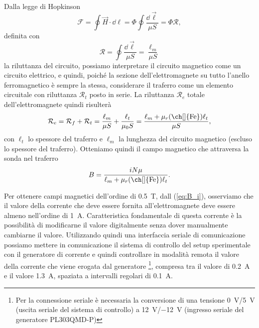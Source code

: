 \documentclass[
    prl,
    reprint, 
    superscriptaddress, 
    altaffilletter, 
    amsmath, 
    amssymb, 
    a4paper,
    varvw]{revtex4-2}
\begin{document}
Dalla legge di Hopkinson \begin{equation}
    \mathcal{F} = \oint \vec{H} \cdot \dd \ell = \Phi \oint \frac{\dd \vec{\ell}}{\mu S} = \Phi \mathcal{R},
\end{equation} definita con \[
    \mathcal{R} = \oint \frac{\dd \vec{\ell}}{\mu S} = \frac{\ell_m}{\mu S}
\] la riluttanza del circuito, possiamo interpretare il circuito magnetico come un circuito elettrico, e quindi, poiché la sezione dell'elettromagnete su tutto l'anello ferromagnetico è sempre la stessa, considerare il traferro come un elemento circuitale con riluttanza $\mathcal{R}_t$ posto in serie. La riluttanza $\mathcal{R}_e$ totale dell'elettromagnete quindi risulterà \begin{equation}
    \mathcal{R}_e = \mathcal{R}_f + \mathcal{R}_t = \frac{\ell_m}{\mu S} + \frac{\ell_t}{\mu_0 S} = \frac{\ell_m + \mu_r\text{(\ch[]{Fe})}\ell_t}{\mu S},
\end{equation} con $\ell_{t}$ lo spessore del traferro e $\ell_{m}$ la lunghezza del circuito magnetico (escluso lo spessore del traferro). Otteniamo quindi il campo magnetico che attraversa la sonda nel traferro \begin{equation}
    B = \frac{iN\mu}{\ell_m + \mu_r\text{(\ch[]{Fe})}\ell_t}.\label{eq:B_i}
\end{equation}

Per ottenere campi magnetici dell'ordine di \SI{0.5}{\tesla}, dall (\ref{eq:B_i}), osserviamo che il valore della corrente che deve essere fornita all'elettromagnete deve essere almeno nell'ordine di \SI{1}{\ampere}. Caratteristica fondamentale di questa corrente è la possibilità di modificarne il valore digitalmente senza dover manualmente cambiarne il valore. Utilizzando quindi una interfaccia seriale di comunicazione possiamo mettere in comunicazione il sistema di controllo del setup sperimentale con il generatore di corrente e quindi controllare in modalità remota il valore della corrente che viene erogata dal generatore \footnote{Per la connessione seriale è necessaria la conversione di una tensione \SI{0}{\volt}/\SI{5}{\volt} (uscita seriale del sistema di controllo) a \SI{+12}{\volt}/\SI{-12}{\volt} (ingresso seriale del generatore PL303QMD-P)}, compresa tra il valore di \SI{0.2}{\ampere} e il valore \SI{1.3}{\ampere}, spaziata a intervalli regolari di \SI{0.1}{\ampere}.
\end{document}
